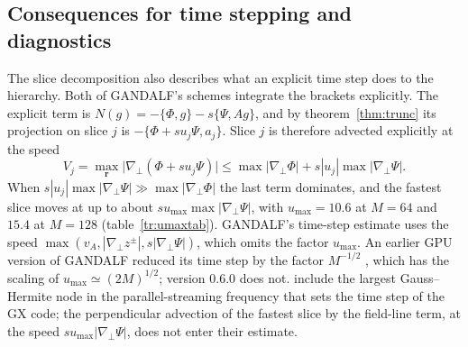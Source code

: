 \subsection{Consequences for time stepping and diagnostics}\label{tr:numsec}

The slice decomposition also describes what an explicit time step does to the hierarchy. Both of GANDALF's schemes integrate the brackets explicitly. The explicit term is $N(g)=-\{\Phi,g\}-s\{\Psi,Ag\}$, and by theorem~\ref{thm:trunc} its projection on slice $j$ is $-\{\Phi+su_j\Psi,a_j\}$. Slice $j$ is therefore advected explicitly at the speed
\begin{equation*}
  V_j=\max_{\boldsymbol r}\big|\nabla_\perp(\Phi+su_j\Psi)\big|\le\max|\nabla_\perp\Phi|+s|u_j|\max|\nabla_\perp\Psi| .
\end{equation*}
When $s|u_j|\max|\nabla_\perp\Psi|\gg\max|\nabla_\perp\Phi|$ the last term dominates, and the fastest slice moves at up to about $su_{\max}\max|\nabla_\perp\Psi|$, with $u_{\max}=10.6$ at $M=64$ and $15.4$ at $M=128$ (table~\ref{tr:umaxtab}). GANDALF's time-step estimate uses the speed $\max(v_A,|\nabla_\perp z^\pm|,s|\nabla_\perp\Psi|)$, which omits the factor $u_{\max}$. An earlier GPU version of GANDALF reduced its time step by the factor $M^{-1/2}$ \citep[eq.~2.26]{KanekarThesis2015}, which has the scaling of $u_{\max}\simeq(2M)^{1/2}$; version 0.6.0 does not. \citet{Mandell2024} include the largest Gauss--Hermite node in the parallel-streaming frequency that sets the time step of the GX code; the perpendicular advection of the fastest slice by the field-line term, at the speed $su_{\max}|\nabla_\perp\Psi|$, does not enter their estimate.

